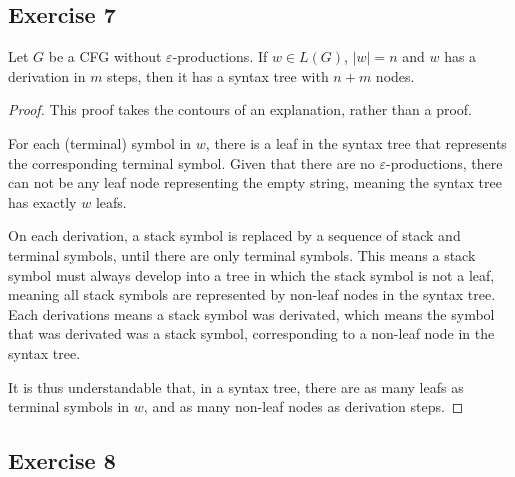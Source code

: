 {\subsection{Exercise 7}
\begin{theorem}
	Let $G$ be a CFG without $\varepsilon$-productions. If $w \in L(G)$, $|w|=n$ and $w$ has a derivation in $m$ steps, then it has a syntax tree with $n+m$ nodes. 
\end{theorem}
\begin{proof}
This proof takes the contours of an explanation, rather than a proof.\par
For each (terminal) symbol in $w$, there is a leaf in the syntax tree that represents the corresponding terminal symbol. Given that there are no $\varepsilon$-productions, there can not be any leaf node representing the empty string, meaning the syntax tree has exactly $w$ leafs.\par
On each derivation, a stack symbol is replaced by a sequence of stack and terminal symbols, until there are only terminal symbols. This means a stack symbol must always develop into a tree in which the stack symbol is not a leaf, meaning all stack symbols are represented by non-leaf nodes in the syntax tree. Each derivations means a stack symbol was derivated, which means the symbol that was derivated was a stack symbol, corresponding to a non-leaf node in the syntax tree.\par
It is thus understandable that, in a syntax tree, there are as many leafs as terminal symbols in $w$, and as many non-leaf nodes as derivation steps.
\end{proof}
\pagebreak
\subsection{Exercise 8}
}
